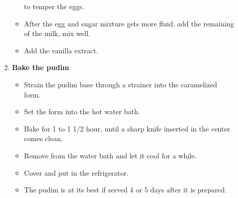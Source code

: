 \documentclass [11pt, letterpaper] {article}
\begin{document}
\begin{description}
\begin{enumerate}
\begin{itemize}
to temper the eggs.
	\item After the egg and sugar mixture gets more fluid, add the
remaining of the milk, mix well.
	\item Add the vanilla extract.
	\end{itemize}
	\item {\bf Bake the pudim}
	\begin{itemize}
	\item Strain the pudim base through a strainer into the
              caramelized form.
	\item Set the form into the hot water bath.
	\item Bake for 1 to 1 1/2 hour, until a sharp knife inserted in
              the center comes clean.
	\item Remove from the water bath and let it cool for a while.
	\item Cover and put in the refrigerator.
	\item The pudim is at its best if served 4 or 5 days after it
	      is prepared.
	\end{itemize}
	\end{enumerate}
\end{description}


\end{document}
